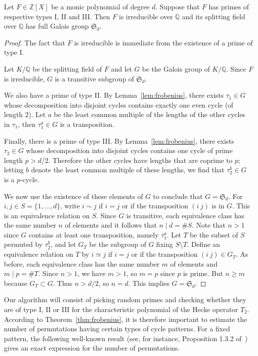 \documentclass{book}
\newcommand{\ZZ}{\mathbb{Z}}
\newcommand{\QQ}{\mathbb{Q}}
\renewcommand{\SS}{\mathfrak{S}}
\begin{document}
\begin{lemma}
  Let $F\in\ZZ[X]$ be a monic polynomial of degree $d$.  Suppose that $F$ has
  primes of respective types I, II and III.  Then $F$
  is irreducible over $\QQ$ and its splitting field over $\QQ$ has full Galois
  group $\SS_d$.
\end{lemma}
\begin{proof}
  The fact that $F$ is irreducible is immediate from the existence of a prime of type
  I. 

  Let $K/\QQ$ be the splitting field of $F$ and let $G$ be the Galois group of
  $K/\QQ$.  Since $F$ is irreducible, $G$ is a transitive subgroup of $\SS_d$. 

  We also have a prime of type II.
  By Lemma~\ref{lem:frobenius}, there exists $\tau_1\in G$ whose decomposition
  into disjoint cycles contains exactly one even cycle (of length
  $2$).  Let $a$ be the least common multiple of the lengths of the other
  cycles in $\tau_1$, then $\tau_1^a\in G$ is a transposition.
  
  Finally, there is a prime of type III.  By Lemma~\ref{lem:frobenius}, there
  exists $\tau_2\in G$ whose decomposition into disjoint cycles contains one
  cycle of prime length $p>d/2$.  Therefore the other cycles have
  lengths that are coprime to $p$; letting $b$ denote the least common
  multiple of these lengths, we find that $\tau_2^b\in G$ is a $p$-cycle.

  We now use the existence of these elements of $G$ to conclude that
  $G=\SS_d$.  For $i,j\in S=\{1,\ldots,d\}$, write $i\sim j$ if $i=j$ or if
  the transposition $(i~j)$ is in $G$.  This is an equivalence relation on
  $S$.  Since $G$ is
  transitive, each equivalence class has the same number $n$ of elements 
  and it follows that $n\mid d=\#S$. Note that $n>1$ since $G$ contains at least one
  transposition, namely $\tau_1^a$. 
  Let $T$ be the subset of $S$ permuted by
  $\tau_2^b$, and let $G_T$ be the subgroup of $G$ fixing $S\setminus T$.
  Define an equivalence relation on $T$ by $i\simeq j$ if $i=j$ or if the transposition
  $(i~j) \in G_T$. As before, each equivalence class has the same number $m$ of elements
  and $m\mid p=\#T$. Since $n>1$, we have $m>1$, so $m=p$ since $p$ is prime.
  But $n\geq m$ because $G_T\subset G$. Thus $n>d/2$, so $n=d$. This implies $G=\SS_d$. 
\end{proof}

Our algorithm will consist of picking random primes and checking whether they
are of type I, II or III for the characteristic polynomial of the Hecke
operator $T_2$.  According to Theorem~\ref{thm:frobenius}, 
it is therefore important to estimate the number of permutations having
certain types of cycle patterns.  For a fixed pattern, the following
well-known result 
(see, for instance, Proposition 1.3.2 of~\cite{Stanley1}) gives an exact
expression for the number of permutations.
\end{document}
